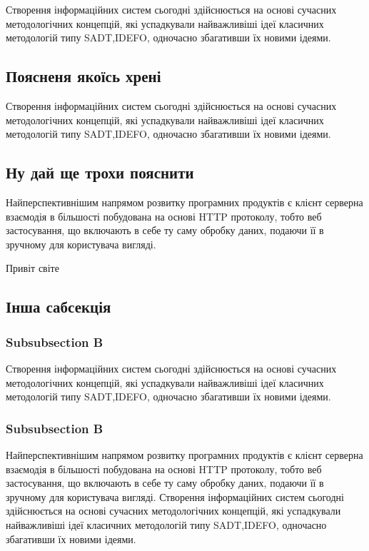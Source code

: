 \documentclass{lib/styles/default-style}
\begin{document}
\pagestyle{default-numbered}

\tableofcontents

\newpage


Створення  інформаційних  систем  сьогодні  здійснюється  
на  основі сучасних  методологічних  концепцій,
які  успадкували  найважливіші  ідеї класичних методологій типу
SADT,IDEFO, одночасно збагативши їх новими ідеями.

\subsection{Поясненя якоїсь хрені}

Створення  інформаційних  систем  сьогодні  здійснюється  
на  основі сучасних  методологічних  концепцій,
які  успадкували  найважливіші  ідеї класичних методологій типу
SADT,IDEFO, одночасно збагативши їх новими ідеями.
\subsection{Ну дай ще трохи пояснити}
Найперспективнішим напрямом розвитку програмних
продуктів є клієнт серверна взаємодія в більшості
побудована на основі HTTP протоколу, тобто веб застосування,
що включають в себе ту саму обробку даних, подаючи її
в зручному для користувача вигляді.

Привіт світе

\newpage
{}
\subsection{Інша сабсекція}
\subsubsection{Subsubsection B}
Створення  інформаційних  систем  сьогодні  здійснюється  
на  основі сучасних  методологічних  концепцій,
які  успадкували  найважливіші  ідеї класичних методологій типу
SADT,IDEFO, одночасно збагативши їх новими ідеями.
\subsubsection{Subsubsection B}
Найперспективнішим напрямом розвитку програмних
продуктів є клієнт серверна взаємодія в більшості
побудована на основі HTTP протоколу, тобто веб застосування,
що включають в себе ту саму обробку даних, подаючи її
в зручному для користувача вигляді.
Створення  інформаційних  систем  сьогодні  здійснюється  
на  основі сучасних  методологічних  концепцій,
які  успадкували  найважливіші  ідеї класичних методологій типу
SADT,IDEFO, одночасно збагативши їх новими ідеями.
\end{document}
